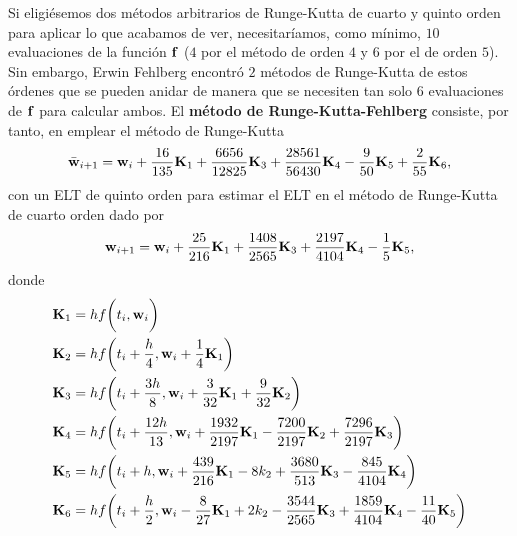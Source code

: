 Si eligiésemos dos métodos arbitrarios de Runge-Kutta de cuarto y quinto orden
para aplicar lo que acabamos de ver,
necesitaríamos, como mínimo, $10$ evaluaciones de la función $\vb{f}{}$
($4$ por el método de orden $4$ y $6$ por el de orden $5$).
Sin embargo, Erwin Fehlberg encontró $2$ métodos de Runge-Kutta de estos órdenes
que se pueden anidar de manera que
se necesiten tan solo $6$ evaluaciones de $\vb{f}{}$ para calcular ambos.
El \textbf{método de Runge-Kutta-Fehlberg} consiste, por tanto, en
emplear el método de Runge-Kutta
\begin{equation*}
    \bar{\vb{w}{}}_{i+1} = \vb{w}{}_i + \frac{16}{135}\vb{K}_1 + \frac{6656}{12825}\vb{K}_3 + \frac{28561}{56430}\vb{K}_4 - \frac{9}{50}\vb{K}_5 + \frac{2}{55}\vb{K}_6,
\end{equation*}
con un ELT de quinto orden para estimar el ELT
en el método de Runge-Kutta de cuarto orden dado por 
\begin{equation*}
    \vb{w}{}_{i+1} = \vb{w}{}_i + \frac{25}{216}\vb{K}_1 + \frac{1408}{2565}\vb{K}_3 + \frac{2197}{4104}\vb{K}_4 - \frac{1}{5}\vb{K}_5,
\end{equation*}
donde 
\begin{align*}
    \vb{K}_1 &=  hf\qty\bigg(t_i, \vb{w}{}_i)\\
    \vb{K}_2 &=  hf\qty\bigg(t_i + \frac{h}{4}, \vb{w}{}_i + \frac{1}{4}\vb{K}_1)\\
    \vb{K}_3 &=  hf\qty\bigg(t_i + \frac{3h}{8}, \vb{w}{}_i + \frac{3}{32}\vb{K}_1 +  \frac{9}{32}\vb{K}_2)\\
    \vb{K}_4 &= hf\qty\bigg(t_i + \frac{12h}{13}, \vb{w}{}_i + \frac{1932}{2197}\vb{K}_1 -   \frac{7200}{2197}\vb{K}_2 +  \frac{7296}{2197}\vb{K}_3) \\
    \vb{K}_5 &= hf\qty\bigg(t_i + h, \vb{w}{}_i + \frac{439}{216}\vb{K}_1 - 8k_2 +  \frac{3680}{513}\vb{K}_3 - \frac{845}{4104}\vb{K}_4) \\
    \vb{K}_6 &= hf\qty\bigg(t_i + \frac{h}{2}, \vb{w}{}_i - \frac{8}{27}\vb{K}_1 + 2k_2 -  \frac{3544}{2565}\vb{K}_3 + \frac{1859}{4104}\vb{K}_4 - \frac{11}{40}\vb{K}_5)
\end{align*}
